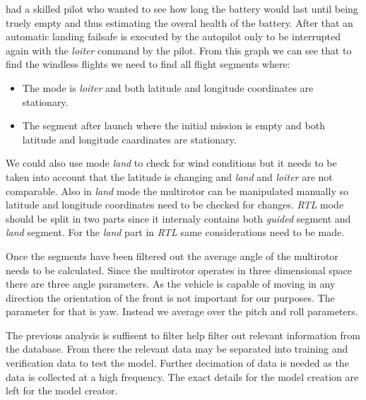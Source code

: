 \documentclass[12pt,oneside]{reedthesis}
\theoremstyle{definition}
\theoremstyle{definition}
\theoremstyle{definition}
\theoremstyle{remark}
\begin{document}
had a skilled pilot who wanted to see how long the battery would last
until being truely empty and thus estimating the overal health of the
battery. After that an automatic landing failsafe is executed by the
autopilot only to be interrupted again with the \emph{loiter} command by
the pilot. From this graph we can see that to find the windless flights
we need to find all flight segments where:
\begin{itemize}
\item
  The mode is \emph{loiter} and both latitude and longitude coordinates
  are stationary.
\item
  The segment after launch where the initial mission is empty and both
  latitude and longitude caardinates are stationary.
\end{itemize}
We could also use mode \emph{land} to check for wind conditions but it
needs to be taken into account that the latitude is changing and
\emph{land} and \emph{loiter} are not comparable. Also in \emph{land}
mode the multirotor can be manipulated manually so latitude and
longitude coordinates need to be checked for changes. \emph{RTL} mode
should be split in two parts since it internaly contains both
\emph{guided} segment and \emph{land} segment. For the \emph{land} part
in \emph{RTL} same considerations need to be made.

Once the segments have been filtered out the average angle of the
multirotor needs to be calculated. Since the multirotor operates in
three dimensional space there are three angle parameters. As the vehicle
is capable of moving in any direction the orientation of the front is
not important for our purposes. The parameter for that is yaw. Instead
we average over the pitch and roll parameters.

The previous analysis is suffisent to filter help filter out relevant
information from the database. From there the relevant data may be
separated into training and verification data to test the model. Further
decimation of data is needed as the data is collected at a high
frequency. The exact details for the model creation are left for the
model creator.
\end{document}
